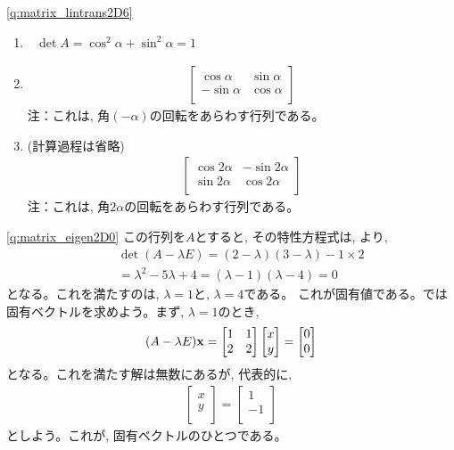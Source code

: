 \ref{q:matrix_lintrans2D6}　
\begin{enumerate}
\item $\,\,\,\,\det A=\cos^2\alpha+\sin^2\alpha=1$
\item \begin{eqnarray}
\begin{bmatrix}
\cos\alpha & \sin\alpha \\
-\sin\alpha & \cos\alpha \\\end{bmatrix}
\end{eqnarray}
注：これは, 角$(-\alpha)$の回転をあらわす行列である。
\item (計算過程は省略)
\begin{eqnarray}\begin{bmatrix}
\cos2\alpha & -\sin2\alpha \\
\sin2\alpha & \cos2\alpha \\\end{bmatrix}
\end{eqnarray}
注：これは, 角$2\alpha$の回転をあらわす行列である。
\end{enumerate}
\mv



% 
\ref{q:matrix_eigen2D0}  この行列を$A$とすると, 
その特性方程式は, より, 
\begin{eqnarray*}
&&\det(A-\lambda E)=(2-\lambda)(3-\lambda)-1\times2\\
&&=\lambda^2-5\lambda+4=(\lambda-1)(\lambda-4)=0
\end{eqnarray*}
となる。これを満たすのは, $\lambda=1$と, $\lambda=4$である。
これが固有値である。では固有ベクトルを求めよう。まず, $\lambda=1$のとき, 
\begin{eqnarray}
(A-\lambda E){\bf x}=
\begin{bmatrix}
1          & 1 \\
2          & 2 \\
\end{bmatrix}
\begin{bmatrix}
x \\
y \\
\end{bmatrix}
=\begin{bmatrix}
0 \\
0 \\
\end{bmatrix}\end{eqnarray}
となる。これを満たす解は無数にあるが, 代表的に, 
\begin{eqnarray}
\begin{bmatrix}
x \\
y \\
\end{bmatrix}
=\begin{bmatrix}
1 \\
-1 \\
\end{bmatrix}
\end{eqnarray}
としよう。これが, 固有ベクトルのひとつである。

